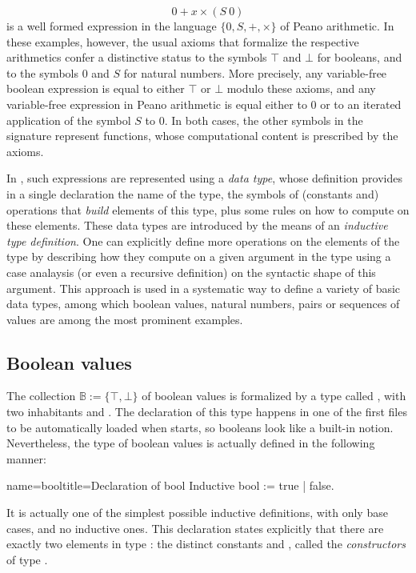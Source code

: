 \[ 0 + x \times (S\ 0) \]
is a well formed expression in the language $\{0,S, +, \times\}$ of
Peano arithmetic. In these examples, however, the usual axioms that
formalize the respective arithmetics confer a distinctive status to
the symbols $\top$ and $\bot$ for booleans, and to the symbols $0$ and
$S$ for natural numbers. More precisely, any variable-free boolean expression
is equal to either $\top$ or $\bot$ modulo these axioms, and any
variable-free expression in Peano arithmetic is equal either to $0$ or
to an iterated application of the symbol $S$ to $0$. In both
cases, the other symbols in the signature represent functions, whose
computational content is prescribed by the axioms.

In \Coq{}, such expressions are represented using a \emph{data type},
whose definition provides in a single declaration the name of the
type, the symbols of (constants and) operations that \emph{build}
elements of this type, plus some rules on how to compute on these
elements. These data types are introduced by the means of an
\emph{inductive type definition}.
One can explicitly define more operations on the elements of
the type by describing how they compute on a given argument in the
type using a case analaysis (or even a recursive definition) on the
syntactic shape of this argument.
This approach is used in a systematic way to define a variety of basic
data types, among which boolean values, natural numbers, pairs or
sequences of values are among the most prominent examples.

\subsection{Boolean values}\label{ssec:boolval}

The collection $\mathbb{B} := \{\top, \bot\}$ of boolean values is
formalized by a type called , with two inhabitants 
and . The declaration of this type happens
in one of the first files to be automatically loaded when \Coq{} starts,
so booleans look like a built-in notion.  Nevertheless, the type of
boolean values is actually defined in the following manner:

\begin{coq}{name=bool}{title=Declaration of bool}
Inductive bool := true | false.
\end{coq}

It is actually one of the simplest possible inductive definitions,
with only base cases, and no inductive ones. This
declaration states explicitly that there are exactly two
elements in type : the distinct constants  and ,
called the \emph{constructors} of type .


